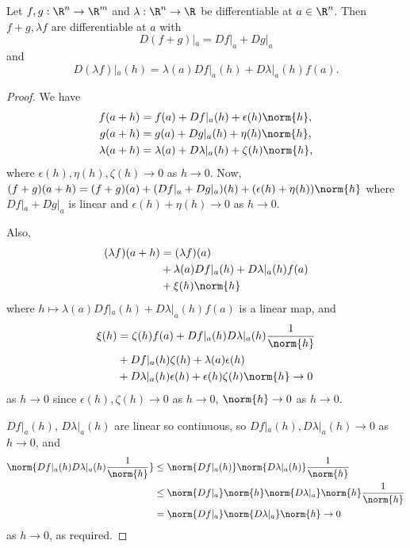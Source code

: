 \begin{proposition} \label{prp:2.4}
    Let $f,g: \R^n\to \R^m$ and $\lambda:\R^n\to\R$ be differentiable at $a\in \R^n$.
    Then $f+g, \lambda f$ are differentiable at $a$ with \[ D(f+g)|_a = Df|_a + Dg|_a \] and \[ D(\lambda f)|_a(h) = \lambda (a) Df|_a(h) + D\lambda |_a(h) f(a). \]
\end{proposition}

\begin{proof}
    We have
    \begin{align*}
        f(a+h) &= f(a) + Df|_a(h) + \epsilon(h) \norm{h}, \\
        g(a+h) &= g(a) + Dg|_a(h) + \eta(h) \norm{h}, \\
        \lambda(a+h) &= \lambda(a) + D\lambda |_a(h) + \zeta(h) \norm{h},
    \end{align*}
    where $\epsilon(h), \eta(h), \zeta(h) \to 0$ as $h\to 0$.
    Now, $(f+g)(a+h) = (f+g)(a) + (Df|_a + Dg|_a)(h) + (\epsilon(h) +\eta(h)) \norm{h}$ where $Df|_a + Dg|_a$ is linear and $\epsilon(h) + \eta(h)\to 0$ as $h\to 0$.

    Also,
    \begin{align*}
        (\lambda f)(a+h) &= (\lambda f)(a) \\
        &+ \lambda(a) Df|_a(h) + D\lambda|_a(h) f(a)\\
        &+ \xi(h)\norm{h}
    \end{align*}
    where $h\mapsto \lambda(a) Df|_a(h) + D\lambda|_a(h) f(a)$ is a linear map, and
    \begin{align*}
        \xi(h) &= \zeta(h)f(a) + Df|_a(h)D\lambda |_a(h) \frac{1}{\norm{h}}\\
        &+ Df|_a(h)\zeta(h) + \lambda (a)\epsilon(h) \\
        &+ D\lambda |_a(h)\epsilon(h) +\epsilon(h) \zeta(h) \norm{h} \to 0
    \end{align*}
    as $h\to 0$ since $\epsilon(h), \zeta(h) \to 0$ as $h\to 0$, $\norm{h}\to 0$ as $h\to 0$.

    $Df|_a(h)$, $D\lambda |_a(h)$ are linear so continuous, so $Df|_a(h), D\lambda |_a(h)\to 0$ as $h\to 0$, and
    \begin{align*}
        \norm{Df|_a(h)D\lambda |_a(h) \frac{1}{\norm{h}}} &\leq \norm{Df|_a(h)} \norm{D\lambda |_a(h)}\frac{1}{\norm{h}}\\
        &\leq \norm{Df|_a}\norm{h} \norm{D\lambda |_a}\norm{h} \frac{1}{\norm{h}}\\
        & = \norm{Df|_a} \norm{D\lambda |_a} \norm{h}\to 0
    \end{align*}
    as $h\to 0$, as required.
\end{proof}

